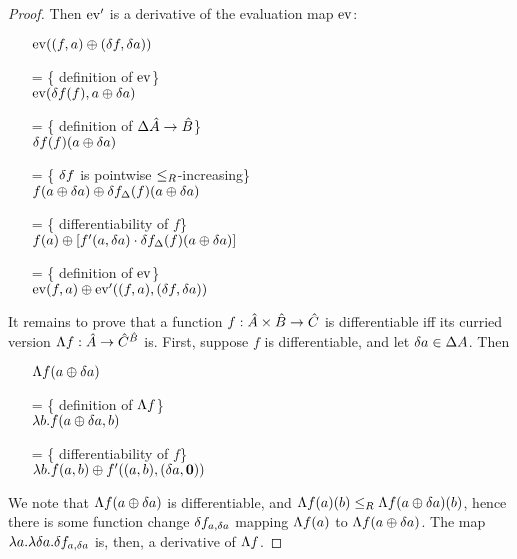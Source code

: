 \begin{proof}
  Then $\operatorname{ev}'$ is a derivative of the evaluation map $\operatorname{ev}$:
  \begin{itemize}
    \item[ ]$\operatorname{ev}((f, a) \oplus (\delta f, \delta a))$
    \item[=]\{ definition of $\operatorname{ev}$\}\\
    $\operatorname{ev}(\delta f(f), a \oplus \delta a)$
    \item[=]\{ definition of $\Delta \hat{A} \rightarrow \hat{B}$\}\\
    $\delta f(f)(a \oplus \delta a)$
    \item[=]\{ $\delta f$ is pointwise $\leq_R$-increasing\}\\
    $f(a \oplus \delta a) \oplus \delta f_\Delta(f)(a \oplus \delta a)$
    \item[=]\{ differentiability of $f$\}\\
    $f(a) \oplus [ f'(a, \delta a)\cdot \delta f_\Delta(f)(a \oplus \delta a) ]$
    \item[=]\{ definition of $\operatorname{ev}$\}\\
    $\operatorname{ev}(f, a) \oplus \operatorname{ev}'((f, a), (\delta f, \delta a))$
  \end{itemize}

  It remains to prove that a function $f : \hat{A} \times \hat{B} \rightarrow \hat{C}$ is differentiable iff its curried
  version $\Lambda{f} : \hat{A} \rightarrow \hat{C}^{\hat{B}}$ is.
  First, suppose $f$ is differentiable, and let $\delta a \in \Delta A$. Then 
  \begin{itemize}
  \item[ ]$\Lambda{f}(a \oplus \delta a)$
  \item[=]\{ definition of $\Lambda{f}$\}\\
  $\lambda b . f(a \oplus \delta a, b)$
  \item[=]\{ differentiability of $f$\}\\
  $\lambda b . f(a, b) \oplus f'((a, b), (\delta a, \textbf{0}))$
  \end{itemize}
  We note that $\Lambda{f}(a \oplus \delta a)$ is differentiable, and $\Lambda{f}(a)(b) \leq_R \Lambda{f}(a \oplus \delta a)(b)$,
  hence there is some function change $\delta f_{a, \delta a}$ mapping $\Lambda{f}(a)$ to $\Lambda{f}(a \oplus \delta a)$. The map
  $\lambda a . \lambda \delta a . \delta f_{a, \delta a}$ is, then, a derivative of $\Lambda{f}$.


\end{proof}
